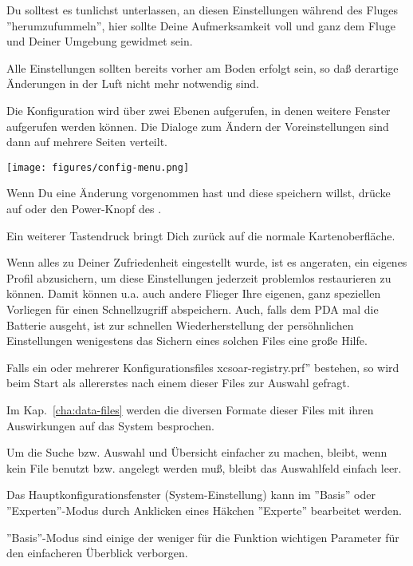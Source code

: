 Du solltest es tunlichst unterlassen, an diesen Einstellungen während des Fluges
''herumzufummeln'', hier sollte Deine Aufmerksamkeit voll und ganz dem Fluge und
Deiner Umgebung gewidmet sein. \warning

Alle Einstellungen sollten bereits vorher am Boden erfolgt sein, so daß derartige
Änderungen in der Luft nicht mehr notwendig sind.

Die Konfiguration wird über zwei Ebenen aufgerufen, in denen weitere Fenster aufgerufen werden können.
Die Dialoge zum Ändern  der Voreinstellungen sind dann auf mehrere Seiten verteilt.

\begin{center}
\texttt{[image: figures/config-menu.png]}
\end{center}

Wenn Du eine Änderung vorgenommen hast und diese speichern willst, drücke auf  oder
den Power-Knopf des \al .

Ein weiterer Tastendruck bringt Dich zurück auf die normale Kartenoberfläche.

\tip Wenn alles zu Deiner Zufriedenheit eingestellt wurde, ist es angeraten, ein eigenes Profil
abzusichern, um diese Einstellungen jederzeit problemlos restaurieren zu können. Damit können u.a. auch
andere Flieger Ihre eigenen, ganz speziellen Vorliegen für einen Schnellzugriff abspeichern.
Auch, falls dem PDA mal  die Batterie ausgeht, ist zur schnellen Wiederherstellung der persöhnlichen
Einstellungen wenigestens das Sichern eines solchen Files eine große Hilfe.

Falls ein oder mehrerer Konfigurationsfiles \verb''xcsoar-registry.prf''  bestehen, so wird beim Start als allererstes nach
einem dieser Files zur Auswahl gefragt.

Im Kap.~\ref{cha:data-files} werden die diversen Formate dieser Files mit ihren
Auswirkungen auf das System besprochen.

Um die Suche bzw. Auswahl und Übersicht einfacher zu machen, bleibt,
wenn kein File benutzt bzw. angelegt werden muß, bleibt das Auswahlfeld einfach leer.

Das Hauptkonfigurationsfenster (System-Einstellung) kann im ''Basis'' oder
''Experten''-Modus durch Anklicken eines Häkchen ''Experte'' bearbeitet werden.

''Basis''-Modus sind einige der weniger für die Funktion wichtigen Parameter für den
einfacheren Überblick verborgen. 

